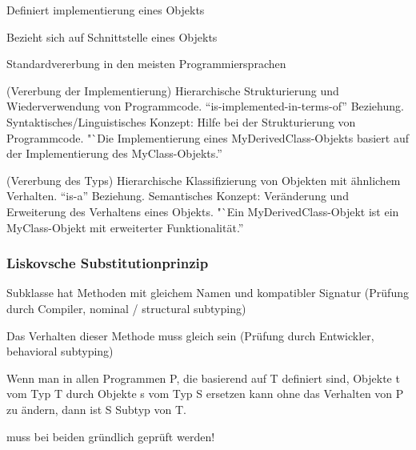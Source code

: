 \documentclass[a4paper,fontsize=9pt, DIV=calc]{scrartcl}
\begin{document}
\begin{multicols}{2}
\begin{multicols}{2}
\begin{description}[leftmargin=*]\itemsep-2mm
    \item[Klasse] Definiert implementierung eines Objekts
    \item[Typ] Bezieht sich auf Schnittstelle eines Objekts
		\item[Vererbung Typ+Implementierung] Standardvererbung in den meisten Programmiersprachen
	\item[Subclassing] (Vererbung der Implementierung) Hierarchische Strukturierung und Wiederverwendung von Programmcode. "`is-implemented-in-terms-of"' Beziehung. Syntaktisches/Linguistisches Konzept: Hilfe bei der Strukturierung von
Programmcode. "`Die Implementierung eines MyDerivedClass-Objekts basiert auf der Implementierung des MyClass-Objekts.”
	\item[Subtyping] (Vererbung des Typs) Hierarchische Klassifizierung von Objekten mit ähnlichem Verhalten. "`is-a"' Beziehung. Semantisches Konzept: Veränderung und Erweiterung des Verhaltens eines Objekts. "`Ein MyDerivedClass-Objekt ist ein MyClass-Objekt mit erweiterter Funktionalität.”
		
\end{description}

\end{multicols}


\begin{multicols}{2}
\subsubsection{Liskovsche Substitutionprinzip}

\begin{description}[leftmargin=*]\itemsep-2mm
    \item[S1] Subklasse hat Methoden mit gleichem Namen und kompatibler Signatur (Prüfung durch Compiler, nominal / structural subtyping)
    \item[S2] Das Verhalten dieser Methode muss gleich sein (Prüfung durch Entwickler, behavioral subtyping)
		\item[S2 besser] Wenn man in allen Programmen P, die basierend auf T definiert sind, Objekte t vom Typ T durch Objekte s vom Typ S ersetzen kann ohne das Verhalten von P zu ändern, dann ist S Subtyp von T.
		\item[Bezug zu Subclassing / Subtyping] muss bei beiden gründlich geprüft werden!
\end{description}
\end{multicols}


\end{multicols}
\end{document}
